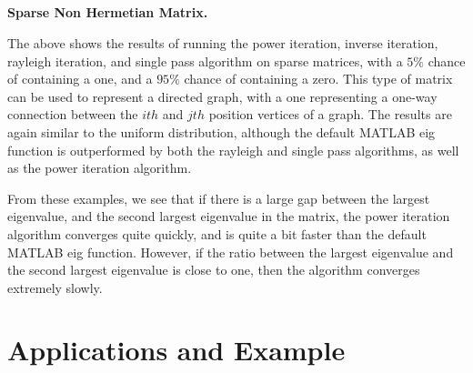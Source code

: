 \documentclass[11pt]{amsart}
\begin{document}
\subsection{} \textbf{Sparse Non Hermetian Matrix.}

\begin{center}
\end{center}

The above shows the results of running the power iteration, inverse iteration, rayleigh iteration, and single pass algorithm on sparse matrices, with a $5\%$ chance of containing a one, and a $95\%$ chance of containing a zero. This type of matrix can be used to represent a directed graph, with a one representing a one-way connection between the $ith$ and $jth$ position vertices of a graph. The results are again similar to the uniform distribution, although the default MATLAB eig function is outperformed by both the rayleigh and single pass algorithms, as well as the power iteration algorithm.

\begin{center}
\end{center}

From these examples, we see that if there is a large gap between the largest eigenvalue, and the second largest eigenvalue in the matrix, the power iteration algorithm converges quite quickly, and is quite a bit faster than the default MATLAB eig function. However, if the ratio between the largest eigenvalue and the second largest eigenvalue is close to one, then the algorithm converges extremely slowly.

\section{Applications and Example}

\end{document}
